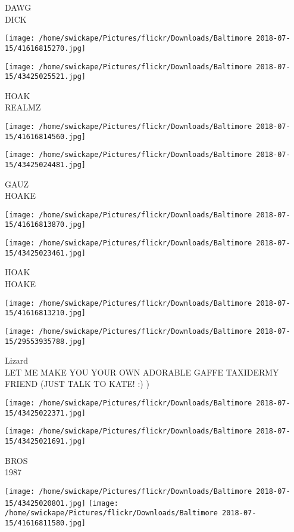 \documentclass[10pt,letterpaper]{article}
\begin{document}
DAWG\\
DICK
\pagebreak

\texttt{[image: /home/swickape/Pictures/flickr/Downloads/Baltimore 2018-07-15/41616815270.jpg]}

\vspace{0.25in}
\texttt{[image: /home/swickape/Pictures/flickr/Downloads/Baltimore 2018-07-15/43425025521.jpg]}

HOAK\\
REALMZ
\pagebreak

\texttt{[image: /home/swickape/Pictures/flickr/Downloads/Baltimore 2018-07-15/41616814560.jpg]}

\vspace{0.25in}
\texttt{[image: /home/swickape/Pictures/flickr/Downloads/Baltimore 2018-07-15/43425024481.jpg]}

GAUZ\\
HOAKE
\pagebreak

\texttt{[image: /home/swickape/Pictures/flickr/Downloads/Baltimore 2018-07-15/41616813870.jpg]}

\vspace{0.25in}
\texttt{[image: /home/swickape/Pictures/flickr/Downloads/Baltimore 2018-07-15/43425023461.jpg]}

HOAK\\
HOAKE
\pagebreak

\texttt{[image: /home/swickape/Pictures/flickr/Downloads/Baltimore 2018-07-15/41616813210.jpg]}

\vspace{0.25in}
\texttt{[image: /home/swickape/Pictures/flickr/Downloads/Baltimore 2018-07-15/29553935788.jpg]}

Lizard\\
LET ME MAKE YOU YOUR OWN ADORABLE GAFFE TAXIDERMY FRIEND (JUST TALK TO KATE! :) )
\pagebreak

\texttt{[image: /home/swickape/Pictures/flickr/Downloads/Baltimore 2018-07-15/43425022371.jpg]}

\vspace{0.25in}
\texttt{[image: /home/swickape/Pictures/flickr/Downloads/Baltimore 2018-07-15/43425021691.jpg]}

BROS\\
1987
\pagebreak

\texttt{[image: /home/swickape/Pictures/flickr/Downloads/Baltimore 2018-07-15/43425020801.jpg]}
\texttt{[image: /home/swickape/Pictures/flickr/Downloads/Baltimore 2018-07-15/41616811580.jpg]}
\end{document}
